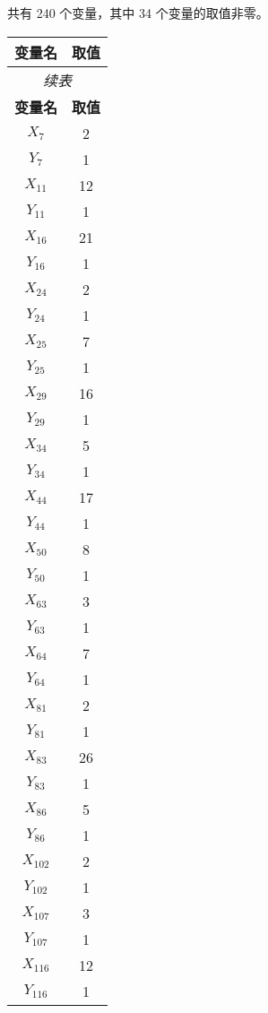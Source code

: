 \documentclass[a4paper,10pt]{article}
\begin{document}
共有 240 个变量，其中 34 个变量的取值非零。

\begin{center}
\begin{longtable}{cc}
\toprule
\textbf{变量名} & \textbf{取值} \\
\midrule
\endfirsthead
\multicolumn{2}{c}{\textit{续表}} \\
\toprule
\textbf{变量名} & \textbf{取值} \\
\midrule
\endhead
\bottomrule
\endfoot
\bottomrule
\endlastfoot
$X_{7}$ & 2 \\
$Y_{7}$ & 1 \\
$X_{11}$ & 12 \\
$Y_{11}$ & 1 \\
$X_{16}$ & 21 \\
$Y_{16}$ & 1 \\
$X_{24}$ & 2 \\
$Y_{24}$ & 1 \\
$X_{25}$ & 7 \\
$Y_{25}$ & 1 \\
$X_{29}$ & 16 \\
$Y_{29}$ & 1 \\
$X_{34}$ & 5 \\
$Y_{34}$ & 1 \\
$X_{44}$ & 17 \\
$Y_{44}$ & 1 \\
$X_{50}$ & 8 \\
$Y_{50}$ & 1 \\
$X_{63}$ & 3 \\
$Y_{63}$ & 1 \\
$X_{64}$ & 7 \\
$Y_{64}$ & 1 \\
$X_{81}$ & 2 \\
$Y_{81}$ & 1 \\
$X_{83}$ & 26 \\
$Y_{83}$ & 1 \\
$X_{86}$ & 5 \\
$Y_{86}$ & 1 \\
$X_{102}$ & 2 \\
$Y_{102}$ & 1 \\
$X_{107}$ & 3 \\
$Y_{107}$ & 1 \\
$X_{116}$ & 12 \\
$Y_{116}$ & 1 \\
\end{longtable}
\end{center}
\end{document}
